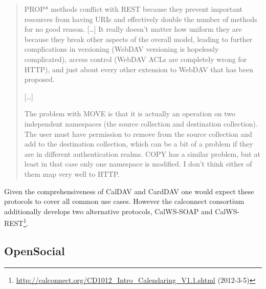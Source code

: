 \documentclass[12pt,a4paper,twoside]{scrartcl}		%
\newcommand{\citeurl}[2]{\url{#1} (#2)}
\begin{document}
\begin{quotation}
  PROP* methods conflict with REST because they prevent important resources from
  having URIs and effectively double the number of methods for no good
  reason. [\ldots] It really doesn't matter how uniform they are because they
  break other aspects of the overall model, leading to further complications in
  versioning (WebDAV versioning is hopelessly complicated), access control
  (WebDAV ACLs are completely wrong for HTTP), and just about every other
  extension to WebDAV that has been proposed.

  [\ldots]

  The problem with MOVE is that it is actually an operation on two independent
  namespaces (the source collection and destination collection). The user must
  have permission to remove from the source collection and add to the
  destination collection, which can be a bit of a problem if they are in
  different authentication realms. COPY has a similar problem, but at least in
  that case only one namespace is modified. I don't think either of them map
  very well to HTTP.
\end{quotation}


Given the comprehensiveness of CalDAV and CardDAV one would expect these
protocols to cover all common use cases. However the calconnect consortium
additionally develops two alternative protocols, CalWS-SOAP and
CalWS-REST\footnote{\citeurl{http://calconnect.org/CD1012_Intro_Calendaring_V1.1.shtml}{2012-3-5}}.

\subsection{OpenSocial}
\label{sec:opensocial-background}
\end{document}
